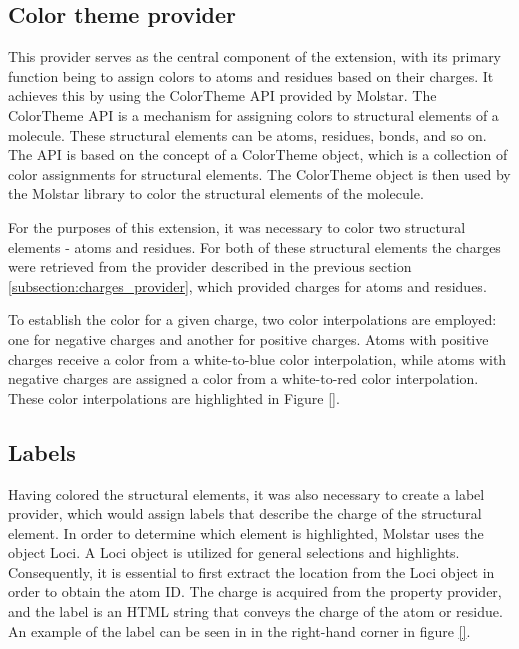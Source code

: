 \documentclass[
  digital,     %
  oneside,     %
  nosansbold,  %
  nocolorbold, %
  lof,         %
  lot,         %
]{fithesis4}
\begin{document}
\subsection{Color theme provider}
\label{subsection:color_theme_provider}

This provider serves as the central component of the extension, with its primary function being to assign colors to atoms and residues based on their charges. It achieves this by using the ColorTheme API provided by Molstar. The ColorTheme API is a mechanism for assigning colors to structural elements of a molecule. These structural elements can be atoms, residues, bonds, and so on. The API is based on the concept of a ColorTheme object, which is a collection of color assignments for structural elements. The ColorTheme object is then used by the Molstar library to color the structural elements of the molecule.

For the purposes of this extension, it was necessary to color two structural elements - atoms and residues. For both of these structural elements the charges were retrieved from the provider described in the previous section \ref{subsection:charges_provider}, which provided charges for atoms and residues.

To establish the color for a given charge, two color interpolations are employed: one for negative charges and another for positive charges. Atoms with positive charges receive a color from a white-to-blue color interpolation, while atoms with negative charges are assigned a color from a white-to-red color interpolation. These color interpolations are highlighted in Figure \ref{}. 

\subsection{Labels}
\label{subsection:labels}

Having colored the structural elements, it was also necessary to create a label provider, which would assign labels that describe the charge of the structural element. In order to determine which element is highlighted, Molstar uses the object Loci. A Loci object is utilized for general selections and highlights. Consequently, it is essential to first extract the location from the Loci object in order to obtain the atom ID. The charge is acquired from the property provider, and the label is an HTML string that conveys the charge of the atom or residue. An example of the label can be seen in in the right-hand corner in figure \ref{}.
\end{document}
